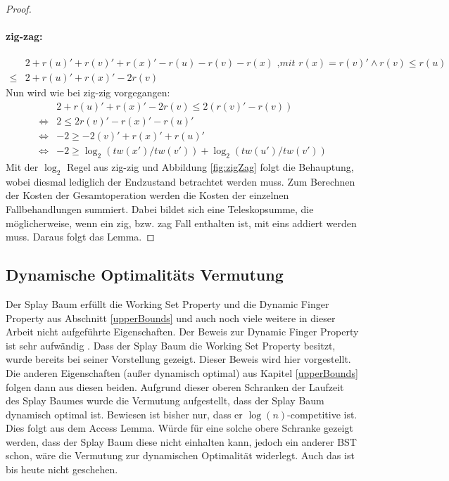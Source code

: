 \documentclass[a4paper,12pt]{article}
\begin{document}
\begin{proof}
	\paragraph{zig-zag:} 
	\begin{align*}
	&2 + r\left(u\right)' +r\left(v\right)' +r\left(x\right)' - r\left(u\right)- r\left(v\right)- r\left(x\right) \textit{ ,mit $r\left(x\right) =  r\left(v\right)' \land r\left(v\right) \leq  r\left(u\right)$} \\
	\leq& 2 + r\left(u\right)' +r\left(x\right)' - 2 r\left(v\right)
	\end{align*}
	Nun wird wie bei zig-zig vorgegangen:
	\begin{align*}
	&  2 + r\left(u\right)' +r\left(x\right)' - 2 r\left(v\right) \leq  2\left(r\left(v\right)'- r\left(v\right)\right)\\
	\Leftrightarrow &2 \leq 2r\left(v\right)' -  r\left(x\right)' - r\left(u\right)'\\
	\Leftrightarrow &-2 \geq -2\left(v\right)' +  r\left(x\right)' + r\left(u\right)'\\
	\Leftrightarrow & -2 \geq \log_2\left(\mathit{tw}\left(x'\right) / \mathit{tw}\left(v'\right)\right) + \log_2\left(\mathit{tw}\left(u'\right) / \mathit{tw}\left(v'\right)\right)
	\end{align*}
	Mit der $\log_2$ Regel aus zig-zig und Abbildung \ref{fig:zigZag} folgt die Behauptung, wobei diesmal lediglich der Endzustand betrachtet werden muss.
	Zum Berechnen der Kosten der Gesamtoperation werden die Kosten der einzelnen Fallbehandlungen summiert. Dabei bildet sich eine Teleskopsumme, die möglicherweise, wenn ein  zig, bzw. zag Fall enthalten ist, mit eins addiert werden muss. Daraus folgt das Lemma.
\end{proof}

\subsection{Dynamische Optimalitäts Vermutung}
Der Splay Baum erfüllt die Working Set Property und die Dynamic Finger Property aus Abschnitt \ref{upperBounds} und auch noch viele weitere in dieser Arbeit nicht aufgeführte Eigenschaften. Der Beweis zur Dynamic Finger Property ist sehr aufwändig \cite{dynFinger}. Dass der Splay Baum die Working Set Property besitzt, wurde bereits bei seiner Vorstellung gezeigt\cite{splay}. Dieser Beweis wird hier vorgestellt. Die anderen Eigenschaften (außer dynamisch optimal) aus Kapitel \ref{upperBounds} folgen dann aus diesen beiden. Aufgrund dieser oberen Schranken der Laufzeit des Splay Baumes wurde die Vermutung aufgestellt, dass der Splay Baum dynamisch optimal ist. Bewiesen ist bisher nur, dass er $\log \left(n\right)$-competitive ist. Dies folgt aus dem Access Lemma. Würde für eine solche obere Schranke gezeigt werden, dass der Splay Baum diese nicht einhalten kann, jedoch ein anderer BST schon, wäre die Vermutung zur dynamischen Optimalität widerlegt. Auch das ist bis heute nicht geschehen. \\
\end{document}
